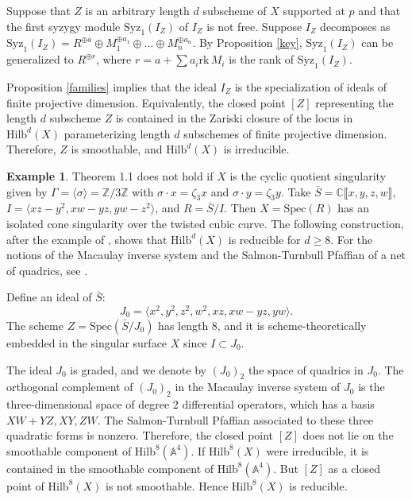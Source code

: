 \documentclass{amsart}[12pt]
\theoremstyle{definition}
\newtheorem{eg}[theorem]{Example}
\theoremstyle{remark}
\numberwithin{equation}{section}
\begin{document}
Suppose that $Z$ is an arbitrary length $d$ subscheme of $X$ supported at $p$ and that the first syzygy module $\mathrm{Syz}_1(I_Z)$ of $I_Z$ is not free. Suppose $I_Z$ decomposes as $\mathrm{Syz}_1(I_Z) = R^{\oplus a} \oplus M_1^{\oplus a_1} \oplus \dots \oplus M_n^{\oplus a_{n}}$. By Proposition \ref{key}, $\mathrm{Syz}_1(I_Z)$ can be generalized to $R^{\oplus r}$, where $r = a + \sum a_i \mathrm{rk} \, M_i$ is the rank of $\mathrm{Syz}_1(I_Z)$.
 
Proposition \ref{families} implies that the ideal $I_Z$ is the specialization of ideals of finite projective dimension. Equivalently, the closed point $[Z]$ representing the length $d$ subscheme $Z$ is contained in the Zariski closure of the locus in $\mathrm{Hilb}^d(X)$ parameterizing length $d$ subschemes of finite projective dimension. Therefore, $Z$ is smoothable, and $\mathrm{Hilb}^d(X)$ is irreducible.

\begin{eg}\label{cevv}
Theorem 1.1 does not hold if $X$ is the cyclic quotient singularity given by $\Gamma = \langle \sigma \rangle = \mathbb{Z}/ 3\mathbb{Z}$ with $\sigma \cdot x = \zeta_3 x$ and $\sigma \cdot y = \zeta_3 y$. Take $\bar{S} = \mathbb{C}\llbracket x, y, z, w\rrbracket$, $I = \langle xz - y^2, xw - yz, yw - z^2 \rangle$, and $R = \bar{S}/I$. Then $X = \mathrm{Spec}(R)$ has an isolated cone singularity over the twisted cubic curve. The following construction, after the example of \cite{8points}, shows that $\mathrm{Hilb}^d(X)$ is reducible for $d \geq 8$. For the notions of the Macaulay inverse system and the Salmon-Turnbull Pfaffian of a net of quadrics, see \cite{8points}.

Define an ideal of $\bar{S}$:
\[
J_0 = \langle x^2, y^2, z^2, w^2, xz, xw - yz, yw  \rangle.
\]
The scheme $Z = \mathrm{Spec}(\bar{S}/J_0)$ has length $8$, and it is scheme-theoretically embedded in the singular surface $X$ since $I \subset J_0$.

The ideal $J_0$ is graded, and we denote by $(J_0)_2$ the space of quadrics in $J_0$. The orthogonal complement of $(J_0)_2$ in the Macaulay inverse system of $J_0$ is the three-dimensional space of degree 2 differential operators, which has a basis $XW + YZ, XY, ZW$. The Salmon-Turnbull Pfaffian associated to these three quadratic forms is nonzero. Therefore, the closed point $[Z]$ does not lie on the smoothable component of $\mathrm{Hilb}^8(\mathbb{A}^4)$. If $\mathrm{Hilb}^8(X)$ were irreducible, it is contained in the smoothable component of $\mathrm{Hilb}^8(\mathbb{A}^4)$. But $[Z]$ as a closed point of $\mathrm{Hilb}^8(X)$ is not smoothable. Hence $\mathrm{Hilb}^8(X)$ is reducible.
\end{eg}
\end{document}
